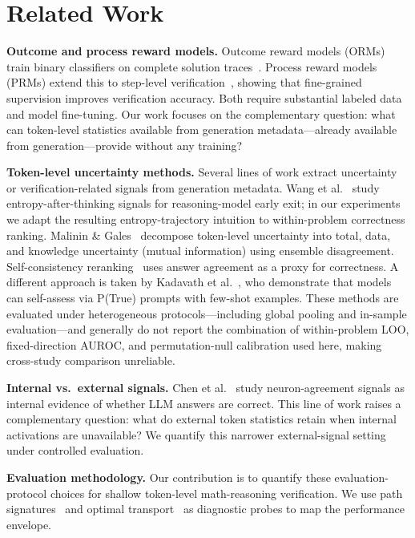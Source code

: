 \documentclass{article}
\begin{document}
\section{Related Work}
\label{sec:related}

\textbf{Outcome and process reward models.} Outcome reward models (ORMs) train binary classifiers on complete solution traces~\cite{cobbe2021gsm8k}. Process reward models (PRMs) extend this to step-level verification~\cite{lightman2023let,uesato2022solving}, showing that fine-grained supervision improves verification accuracy. Both require substantial labeled data and model fine-tuning. Our work focuses on the complementary question: what can token-level statistics available from generation metadata---already available from generation---provide without any training?

\textbf{Token-level uncertainty methods.} Several lines of work extract uncertainty or verification-related signals from generation metadata. Wang et al.~\cite{wang2025eat} study entropy-after-thinking signals for reasoning-model early exit; in our experiments we adapt the resulting entropy-trajectory intuition to within-problem correctness ranking. Malinin \& Gales~\cite{malinin2021uncertainty} decompose token-level uncertainty into total, data, and knowledge uncertainty (mutual information) using ensemble disagreement. Self-consistency reranking~\cite{wang2023selfconsistency} uses answer agreement as a proxy for correctness. A different approach is taken by Kadavath et al.~\cite{kadavath2022language}, who demonstrate that models can self-assess via P(True) prompts with few-shot examples. These methods are evaluated under heterogeneous protocols---including global pooling and in-sample evaluation---and generally do not report the combination of within-problem LOO, fixed-direction AUROC, and permutation-null calibration used here, making cross-study comparison unreliable.

\textbf{Internal vs.\ external signals.} Chen et al.~\cite{chen2025nad} study neuron-agreement signals as internal evidence of whether LLM answers are correct. This line of work raises a complementary question: what do external token statistics retain when internal activations are unavailable? We quantify this narrower external-signal setting under controlled evaluation.

\textbf{Evaluation methodology.} Our contribution is to quantify these evaluation-protocol choices for shallow token-level math-reasoning verification. We use path signatures~\cite{lyons1998differential,chen1958integration,kidger2019deep,chevyrev2016primer} and optimal transport~\cite{peyre2019computational} as diagnostic probes to map the performance envelope.
\end{document}
